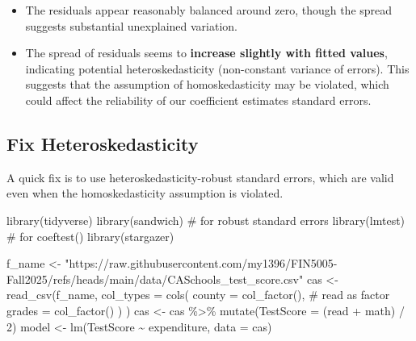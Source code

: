 \documentclass[
  12pt,
  a4paper,
]{scrbook}
\newenvironment{Shaded}{\begin{snugshade}}{\end{snugshade}}
\newcommand{\AttributeTok}[1]{\textcolor[rgb]{0.40,0.45,0.13}{#1}}
\newcommand{\CommentTok}[1]{\textcolor[rgb]{0.37,0.37,0.37}{#1}}
\newcommand{\DecValTok}[1]{\textcolor[rgb]{0.68,0.00,0.00}{#1}}
\newcommand{\FunctionTok}[1]{\textcolor[rgb]{0.28,0.35,0.67}{#1}}
\newcommand{\NormalTok}[1]{\textcolor[rgb]{0.00,0.23,0.31}{#1}}
\newcommand{\OtherTok}[1]{\textcolor[rgb]{0.00,0.23,0.31}{#1}}
\newcommand{\SpecialCharTok}[1]{\textcolor[rgb]{0.37,0.37,0.37}{#1}}
\newcommand{\StringTok}[1]{\textcolor[rgb]{0.13,0.47,0.30}{#1}}
\theoremstyle{plain}
\theoremstyle{definition}
\theoremstyle{remark}
\begin{document}
\begin{itemize}
\item
  The residuals appear reasonably balanced around zero, though the
  spread suggests substantial unexplained variation.
\item
  The spread of residuals seems to \textbf{increase slightly with fitted
  values}, indicating potential heteroskedasticity (non-constant
  variance of errors). This suggests that the assumption of
  homoskedasticity may be violated, which could affect the reliability
  of our coefficient estimates standard errors.
\end{itemize}

\subsection{Fix Heteroskedasticity}\label{fix-heteroskedasticity}

A quick fix is to use {heteroskedasticity-robust standard errors}, which
are valid even when the homoskedasticity assumption is violated.

\begin{Shaded}
\begin{Highlighting}[]
\FunctionTok{library}\NormalTok{(tidyverse)}
\FunctionTok{library}\NormalTok{(sandwich) }\CommentTok{\# for robust standard errors}
\FunctionTok{library}\NormalTok{(lmtest) }\CommentTok{\# for coeftest()}
\FunctionTok{library}\NormalTok{(stargazer)}

\NormalTok{f\_name }\OtherTok{\textless{}{-}} \StringTok{"https://raw.githubusercontent.com/my1396/FIN5005{-}Fall2025/refs/heads/main/data/CASchools\_test\_score.csv"}
\NormalTok{cas }\OtherTok{\textless{}{-}} \FunctionTok{read\_csv}\NormalTok{(f\_name,}
    \AttributeTok{col\_types =} \FunctionTok{cols}\NormalTok{(}
        \AttributeTok{county =} \FunctionTok{col\_factor}\NormalTok{(), }\CommentTok{\# read as factor}
        \AttributeTok{grades =} \FunctionTok{col\_factor}\NormalTok{()}
\NormalTok{    )}
\NormalTok{)}
\NormalTok{cas }\OtherTok{\textless{}{-}}\NormalTok{ cas }\SpecialCharTok{\%\textgreater{}\%}
    \FunctionTok{mutate}\NormalTok{(}\AttributeTok{TestScore =}\NormalTok{ (read }\SpecialCharTok{+}\NormalTok{ math) }\SpecialCharTok{/} \DecValTok{2}\NormalTok{)}
\NormalTok{model }\OtherTok{\textless{}{-}} \FunctionTok{lm}\NormalTok{(TestScore }\SpecialCharTok{\textasciitilde{}}\NormalTok{ expenditure, }\AttributeTok{data =}\NormalTok{ cas)}
\end{Highlighting}
\end{Shaded}
\end{document}

